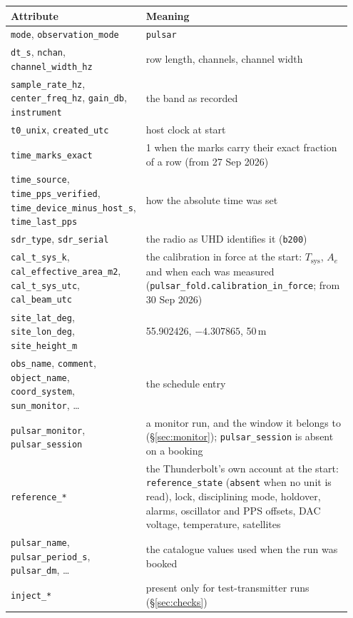 \documentclass[11pt,a4paper]{article}
\newcommand{\code}[1]{\texttt{#1}}
\begin{document}
\begin{longtable}{@{}p{0.30\linewidth}p{0.65\linewidth}@{}}
\toprule
Attribute & Meaning \\
\midrule
\code{mode}, \code{observation\_mode} & \code{pulsar} \\
\code{dt\_s}, \code{nchan}, \code{channel\_width\_hz} & row length, channels, channel width \\
\code{sample\_rate\_hz}, \code{center\_freq\_hz}, \code{gain\_db}, \code{instrument} & the band as recorded \\
\code{t0\_unix}, \code{created\_utc} & host clock at start \\
\code{time\_marks\_exact} & 1 when the marks carry their exact fraction of a row (from 27 Sep 2026) \\
\code{time\_source}, \code{time\_pps\_verified}, \code{time\_device\_minus\_host\_s}, \code{time\_last\_pps} & how the absolute time was set \\
\code{sdr\_type}, \code{sdr\_serial} & the radio as UHD identifies it (\code{b200}) \\
\code{cal\_t\_sys\_k}, \code{cal\_effective\_area\_m2}, \code{cal\_t\_sys\_utc}, \code{cal\_beam\_utc} & the calibration in force at the start: $T_\mathrm{sys}$, $A_e$ and when each was measured (\code{pulsar\_fold.calibration\_in\_force}; from 30 Sep 2026) \\
\code{site\_lat\_deg}, \code{site\_lon\_deg}, \code{site\_height\_m} & 55.902426, $-4.307865$, 50\,m \\
\code{obs\_name}, \code{comment}, \code{object\_name}, \code{coord\_system}, \code{sun\_monitor}, \ldots & the schedule entry \\
\code{pulsar\_monitor}, \code{pulsar\_session} & a monitor run, and the window it belongs to (\S\ref{sec:monitor}); \code{pulsar\_session} is absent on a booking \\
\code{reference\_*} & the Thunderbolt's own account at the start: \code{reference\_state} (\code{absent} when no unit is read), lock, disciplining mode, holdover, alarms, oscillator and PPS offsets, DAC voltage, temperature, satellites \\
\code{pulsar\_name}, \code{pulsar\_period\_s}, \code{pulsar\_dm}, \ldots & the catalogue values used when the run was booked \\
\code{inject\_*} & present only for test-transmitter runs (\S\ref{sec:checks}) \\
\bottomrule
\end{longtable}
\end{document}
